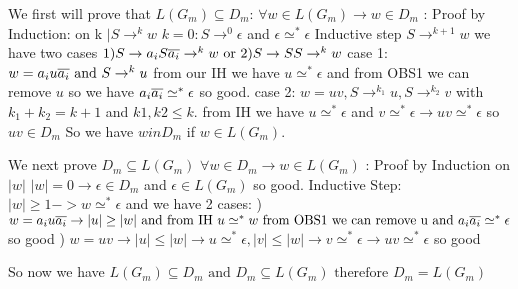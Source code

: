 \documentclass[12pt]{article}
\begin{document}
We first will prove that $L(G_m) \subseteq D_m$:\newline
$\forall w \in L(G_m) \rightarrow w \in D_m$ : Proof by Induction: on k $\mid S \rightarrow^k w$\newline
$k = 0 : S \rightarrow^0 \epsilon$ and $\epsilon \simeq^* \epsilon$\newline
Inductive step \newline
$S \rightarrow^{k+1} w$ we have two cases $1) S \rightarrow a_iS\overline{a_i} \rightarrow^{k} w \text{ or } 2)S \rightarrow SS \rightarrow^{k} w$\newline
case 1: $w = a_iu\overline{a_i} \text{ and } S \rightarrow^k u$ from our IH we have $u \simeq^* \epsilon$ and from OBS1 we can remove $u$ so we have $a_i\overline{a_i} \simeq^* \epsilon$ so good.\newline
case 2: $w = uv , S\rightarrow^{k_1} u , S\rightarrow^{k_2} v$ with $k_1 + k_2 = k + 1$ and $k1, k2 \le k$.\newline
from IH we have $u \simeq^* \epsilon$ and $v \simeq^* \epsilon \rightarrow uv  \simeq^* \epsilon$ so $uv \in D_m$
So we have $w in D_m$ if $w \in L(G_m)$.\newline

We next prove $D_m \subseteq L(G_m)$
$\forall w \in D_m \rightarrow w \in L(G_m)$ : Proof by Induction on $|w|$\newline
$|w| = 0 \rightarrow \epsilon \in D_m$ and $\epsilon \in L(G_m)$ so good.\newline
Inductive Step:\newline
$|w| \ge 1 -> w \simeq^* \epsilon$ and we have 2 cases: ) $w = a_iu\overline{a_i} \rightarrow |u| \ge |w| \text{ and from IH } u \simeq^* w \text{ from OBS1 we can remove u and } a_i\overline{a_i} \simeq^* \epsilon$ so good ) $w=uv \rightarrow |u| \le |w| \rightarrow u \simeq^* \epsilon , |v| \le |w| \rightarrow v \simeq^* \epsilon \rightarrow uv \simeq^* \epsilon$ so good\newline

So now we have $L(G_m) \subseteq D_m \text{ and } D_m \subseteq L(G_m) \text{ therefore } D_m = L(G_m)$
\end{document}
